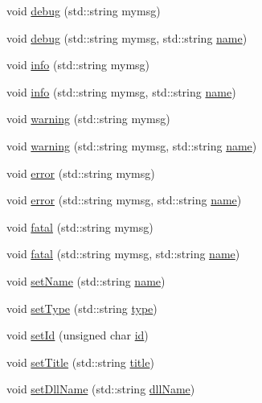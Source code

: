\begin{DoxyCompactItemize}
void \hyperlink{classObject_aac010553f022165573714b7014a15f0d}{debug} (std\+::string mymsg)
\item 
void \hyperlink{classObject_a6c9a0397ca804e04d675ed05683f5420}{debug} (std\+::string mymsg, std\+::string \hyperlink{classObject_a300f4c05dd468c7bb8b3c968868443c1}{name})
\item 
void \hyperlink{classObject_a644fd329ea4cb85f54fa6846484b84a8}{info} (std\+::string mymsg)
\item 
void \hyperlink{classObject_a1ca123253dfd30fc28b156f521dcbdae}{info} (std\+::string mymsg, std\+::string \hyperlink{classObject_a300f4c05dd468c7bb8b3c968868443c1}{name})
\item 
void \hyperlink{classObject_a65cd4fda577711660821fd2cd5a3b4c9}{warning} (std\+::string mymsg)
\item 
void \hyperlink{classObject_a11f101db4dd73d9391b0231818881d86}{warning} (std\+::string mymsg, std\+::string \hyperlink{classObject_a300f4c05dd468c7bb8b3c968868443c1}{name})
\item 
void \hyperlink{classObject_a204a95f57818c0f811933917a30eff45}{error} (std\+::string mymsg)
\item 
void \hyperlink{classObject_ad7f6c457733082efa2f9ff5f5c8e119a}{error} (std\+::string mymsg, std\+::string \hyperlink{classObject_a300f4c05dd468c7bb8b3c968868443c1}{name})
\item 
void \hyperlink{classObject_aad5a16aac7516ce65bd5ec02ab07fc80}{fatal} (std\+::string mymsg)
\item 
void \hyperlink{classObject_ae62acd3d09f716220f75f252dc38bc9a}{fatal} (std\+::string mymsg, std\+::string \hyperlink{classObject_a300f4c05dd468c7bb8b3c968868443c1}{name})
\item 
void \hyperlink{classObject_ae30fea75683c2d149b6b6d17c09ecd0c}{set\+Name} (std\+::string \hyperlink{classObject_a300f4c05dd468c7bb8b3c968868443c1}{name})
\item 
void \hyperlink{classObject_aae534cc9d982bcb9b99fd505f2e103a5}{set\+Type} (std\+::string \hyperlink{classObject_a84f99f70f144a83e1582d1d0f84e4e62}{type})
\item 
void \hyperlink{classObject_a398fe08cba594a0ce6891d59fe4f159f}{set\+Id} (unsigned char \hyperlink{classObject_af99145335cc61ff6e2798ea17db009d2}{id})
\item 
void \hyperlink{classObject_a89557dbbad5bcaa02652f5d7fa35d20f}{set\+Title} (std\+::string \hyperlink{classObject_a73a0f1a41828fdd8303dd662446fb6c3}{title})
\item 
void \hyperlink{classObject_a870c5af919958c2136623b2d7816d123}{set\+Dll\+Name} (std\+::string \hyperlink{classObject_a2e3947f2870094c332d7454117f3ec63}{dll\+Name})

\end{DoxyCompactItemize}
